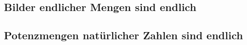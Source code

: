 \documentclass[main.tex]{subfiles}
\begin{document}
\subsection{Bilder endlicher Mengen sind endlich}

\subsection{Potenzmengen natürlicher Zahlen sind endlich}

\end{document}
